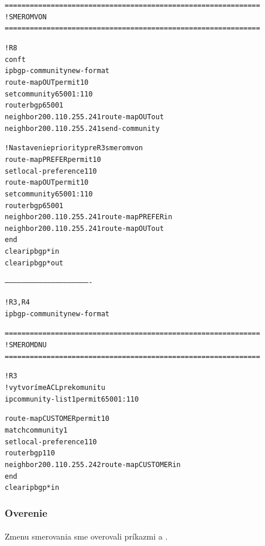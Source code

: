 \documentclass[12pt,twoside,a4paper]{report}
\begin{document}
\noindent
{\selectfont
\begin{small}
\begin{alltt}
=============================================================
!SMEROM VON
=============================================================

!R8
conf t
ip bgp-community new-format
route-map OUT permit 10
set community 65001:110
router bgp 65001
neighbor 200.110.255.241 route-map OUT out
neighbor 200.110.255.241 send-community

!Nastavenie priority pre R3 smerom von
route-map PREFER permit 10
  set local-preference 110
route-map OUT permit 10
  set community 65001:110
router bgp 65001
  neighbor 200.110.255.241 route-map PREFER in
  neighbor 200.110.255.241 route-map OUT out
end
clear ip bgp * in
clear ip bgp * out


-------------------------------------------------------------


!R3, R4
ip bgp-community new-format



=============================================================
!SMEROM DNU
=============================================================

!R3
!vytvoríme ACL pre komunitu
ip community-list 1 permit 65001:110

route-map CUSTOMER permit 10
  match community 1
  set local-preference 110
router bgp 110
  neighbor 200.110.255.242 route-map CUSTOMER in
end
clear ip bgp * in
\end{alltt}
\end{small}
}

\subsubsection{Overenie}
\paragraph{}
Zmenu smerovania sme overovali príkazmi  a .
\end{document}
